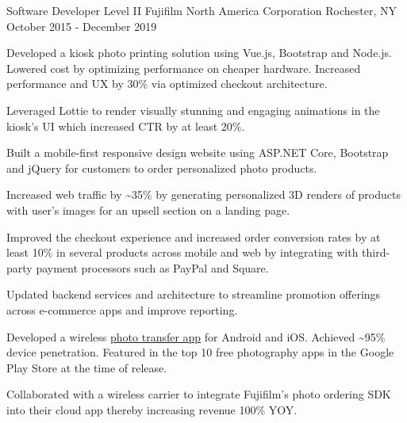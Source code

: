 \begin{cventries}
  \cventry
    {Software Developer Level II} %
    {Fujifilm North America Corporation} %
    {Rochester, NY} %
    {October 2015 - December 2019} %
    {
      \begin{cvitems} %
        \item {Developed a kiosk photo printing solution using Vue.js, Bootstrap and Node.js. Lowered cost by optimizing performance on cheaper hardware. Increased performance and UX by 30\% via optimized checkout architecture.}
        \item {Leveraged Lottie to render visually stunning and engaging animations in the kiosk's UI which increased CTR by at least 20\%.}
        \item {Built a mobile-first responsive design website using ASP.NET Core, Bootstrap and jQuery for customers to order personalized photo products.}
        \item {Increased web traffic by \textasciitilde35\% by generating personalized 3D renders of products with user's images for an upsell section on a landing page.}
        \item {Improved the checkout experience and increased order conversion rates by at least 10\% in several products across mobile and web by integrating with third-party payment processors such as PayPal and Square.}
        \item {Updated backend services and architecture to streamline promotion offerings across e-commerce apps and improve reporting.}
        \item {Developed a wireless \href{https://play.google.com/store/apps/details?id=com.fujifilm.wifi}{photo transfer app} for Android and iOS. Achieved \textasciitilde95\% device penetration. Featured in the top 10 free photography apps in the Google Play Store at the time of release.}
        \item {Collaborated with a wireless carrier to integrate Fujifilm’s photo ordering SDK into their cloud app thereby increasing revenue 100\% YOY.}
      \end{cvitems}
    }


\end{cventries}
